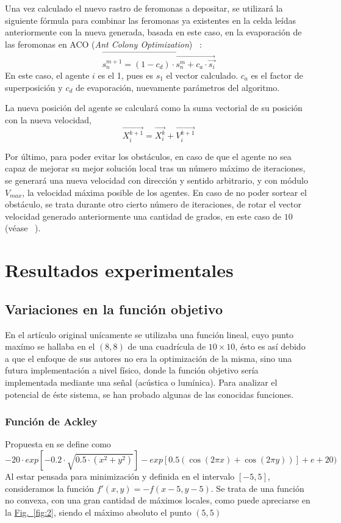 \documentclass[runningheads]{llncs}
\newcommand{\refcruzada}[2]{\hyperref[#2]{#1~\ref{#2}}}
\begin{document}
    Una vez calculado el nuevo rastro de feromonas a depositar, se utilizará la siguiente fórmula para combinar las feromonas ya existentes en la celda leídas anteriormente con la nueva generada, basada en este caso, en la evaporación de las feromonas en ACO (\textit{Ant Colony Optimization}) ~\cite{ACO}:
    \[
        \vec{s_n^{m+1}=(1-c_d)\cdot\vec{s_n^m+c_a\cdot\vec{s_i}}}
    \]
    En este caso, el agente $i$ es el 1, pues es $s_1$ el vector calculado. $c_a$ es el factor de superposición y $c_d$ de evaporación, nuevamente parámetros del algoritmo.

    La nueva posición del agente se calculará como la suma vectorial de su posición con la nueva velocidad,
    \[  \vec{ X_i^{k+1} } = \vec{X_i^k} + \vec{ V_i^{k+1} }  \]

    Por último, para poder evitar los obstáculos, en caso de que el agente no sea capaz de mejorar su mejor solución local tras un número máximo de iteraciones, se generará una nueva velocidad con dirección y sentido arbitrario, y con módulo $V_{max}$, la velocidad máxima posible de los agentes. En caso de no poder sortear el obstáculo, se trata durante otro cierto número de iteraciones, de rotar el vector velocidad generado anteriormente una cantidad de grados, en este caso de $10$ (véase ~\cite{referencedPaper}).


    \section{Resultados experimentales}



    \subsection{Variaciones en la función objetivo}
    En el artículo original \cite{initialPaper} unícamente se utilizaba una función lineal, cuyo punto maxímo se hallaba en el $(8,8)$ de una cuadrícula de $10\times10$, ésto es así debido a que el enfoque de sus autores no era la optimización de la misma, sino una futura implementación a nivel físico, donde la función objetivo sería implementada mediante una señal (acústica o lumínica). Para analizar el potencial de éste sistema, se han probado algunas de las conocidas funciones.

    \subsubsection{Función de Ackley} Propuesta en \cite{AckleyFunction} se define como
    \[-20 \cdot exp[-0.2 \cdot \sqrt{0.5 \cdot (x^2 + y^2)}] - exp[0.5 ( \cos(2 \pi x)
    + \cos(2 \pi y))] + e + 20)\]
    Al estar pensada para minimización y definida en el intervalo $[-5,5]$, consideramos la función $f'(x,y)=-f(x-5, y-5)$. Se trata de una función no convexa, con una gran cantidad de máximos locales, como puede apreciarse en la \refcruzada{Fig.}{fig:2}, siendo el máximo absoluto el punto $(5,5)$
\end{document}
